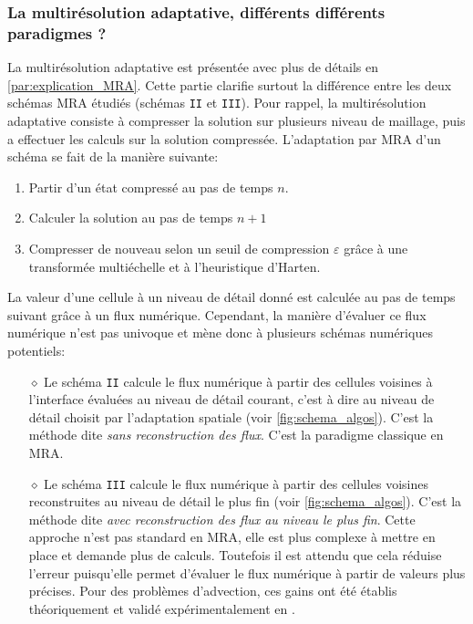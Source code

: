         \subsubsection{La multirésolution adaptative, différents différents paradigmes ?}\label{par:paradigme_MRA}
            La multirésolution adaptative est présentée avec plus de détails en \ref{par:explication_MRA}.    
            Cette partie clarifie surtout la différence entre les deux schémas MRA étudiés (schémas \texttt{II} et \texttt{III}).
            Pour rappel, la multirésolution adaptative consiste à compresser la solution sur plusieurs niveau de maillage,
            puis a effectuer les calculs sur la solution compressée.
            L'adaptation par MRA d'un schéma se fait de la manière suivante:
            \begin{enumerate}
                \item Partir d'un état compressé au pas de temps $n$.
                \item Calculer la solution au pas de temps $n+1$
                \item Compresser de nouveau selon un seuil de compression $\varepsilon$ grâce à une transformée multiéchelle et à l'heuristique d'Harten.
            \end{enumerate}
            La valeur d'une cellule à un niveau de détail donné est calculée au pas de temps suivant
            grâce à un flux numérique. 
            Cependant, la manière d'évaluer ce flux numérique n'est pas univoque et mène donc à plusieurs schémas numériques potentiels:
            \begin{itemize}
                \item[$\diamond$] Le schéma \texttt{II} calcule le flux numérique
                à partir des cellules voisines à l'interface évaluées au niveau de détail courant, c'est à dire au niveau de détail choisit par l'adaptation spatiale (voir \ref{fig:schema_algos}). 
                C'est la méthode dite \textit{sans reconstruction des flux}. C'est la paradigme classique en MRA.
                \item[$\diamond$] Le schéma \texttt{III} calcule le flux numérique 
                à partir des cellules voisines reconstruites au niveau de détail le plus fin (voir \ref{fig:schema_algos}). C'est la méthode dite \textit{avec reconstruction des flux au niveau le plus fin}.
                Cette approche n'est pas standard en MRA, elle est plus complexe à mettre en place et demande plus de calculs.
                Toutefois il est attendu que cela réduise l'erreur puisqu'elle permet d'évaluer le flux numérique à partir de valeurs plus précises.
                Pour des problèmes d'advection, ces gains ont été établis théoriquement et validé expérimentalement en \cite{belloti_et_al_2025}.
            \end{itemize}
